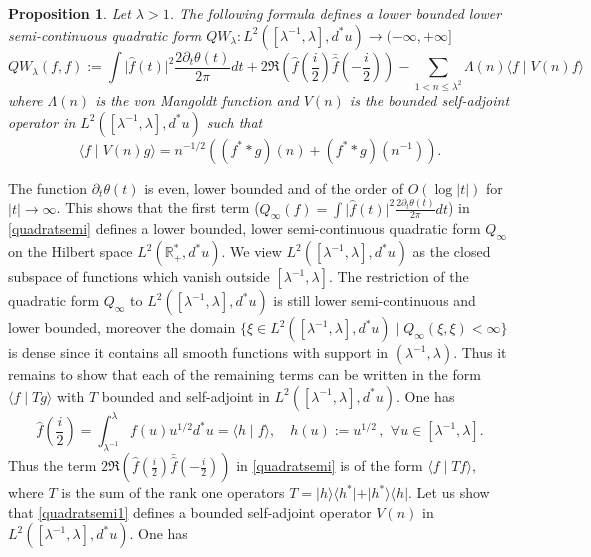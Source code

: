 \documentclass[cupthm]{CUP-JNL-JMJ}
\def\R{{\mathbb R}}
\def\qqq{\,,\,~\forall}
\numberwithin{equation}{section}
\theoremstyle{cupplain}
\newtheorem{proposition}[theorem]{Proposition}
\theoremstyle{cupdefinition}
\theoremstyle{cupremark}
\theoremstyle{cupproof}
\begin{document}
\begin{proposition}\label{Hilbert} Let $\lambda>1$. The following formula defines a lower bounded lower semi-continuous quadratic form $QW_\lambda:L^2([\lambda^{-1},\lambda],d^*u)\to (-\infty,+\infty]$
	 \begin{equation}\label{quadratsemi}
 QW_\lambda(f,f):=\int 
\vert{\widehat f}(t)\vert^2\frac{2\partial_t\theta(t)}{2 \pi}dt + 2 \Re\left({\widehat f}(\frac i2)\bar {\widehat f}(-\frac i2)\right)-\sum_{1<n\leq \lambda^2} \Lambda(n)\langle f\mid V(n)f\rangle
\end{equation}
where $\Lambda(n)$ is the von Mangoldt function and  $V(n)$ is the bounded self-adjoint operator in $L^2([\lambda^{-1},\lambda],d^*u)$ such that 
\begin{equation}\label{quadratsemi1}
 \langle f\mid V(n)g\rangle=n^{-1/2}\left((f^**g)(n)+(f^**g)(n^{-1})\right ).
\end{equation}
\end{proposition}
\proof The function $\partial_t\theta(t)$ is even, lower bounded and of the order of $O(\log \vert t\vert) $ for $\vert t\vert\to \infty$. This shows that the first term ($Q_\infty(f)=\int\vert{\widehat f}(t)\vert^2\frac{2\partial_t\theta(t)}{2 \pi}dt$)  in \eqref{quadratsemi} defines  a lower bounded, lower semi-continuous quadratic form $Q_\infty$ on the Hilbert space $L^2(\R_+^*,d^*u)$. We view $L^2([\lambda^{-1},\lambda],d^*u)$ as the closed subspace of functions which vanish outside $[\lambda^{-1},\lambda]$. The restriction of the  quadratic form $Q_\infty$ to $L^2([\lambda^{-1},\lambda],d^*u)$ is still lower semi-continuous and lower  bounded, moreover the domain $\{\xi\in L^2([\lambda^{-1},\lambda],d^*u)\mid Q_\infty(\xi,\xi)<\infty\}$ is dense since it contains all smooth functions with support in $(\lambda^{-1},\lambda)$. Thus it remains to show that each of  the remaining terms can be written in the form $\langle f\mid Tg\rangle$ with $T$ bounded and self-adjoint in $L^2([\lambda^{-1},\lambda],d^*u)$. One has 
$$
{\widehat f}(\frac i2)=\int_{\lambda^{-1}}^\lambda f(u)u^{1/2}d^*u=\langle h\mid f\rangle,  \quad h(u):=u^{1/2} \qqq u\in [\lambda^{-1},\lambda].
$$
Thus the term $2 \Re\left({\widehat f}(\frac i2)\bar {\widehat f}(-\frac i2)\right)$  in \eqref{quadratsemi} is of  the form $\langle f\mid Tf\rangle$, where $T$ is the sum of the rank one operators $T=\vert h\rangle \langle h^*\vert+\vert h^*\rangle \langle h\vert$. Let us show that  
  \eqref{quadratsemi1} defines a bounded self-adjoint operator $V(n)$ in $L^2([\lambda^{-1},\lambda],d^*u)$. One has 
\end{document}
